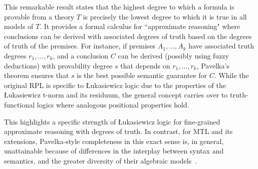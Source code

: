 This remarkable result states that the highest degree to which a formula is provable from a theory $T$ is precisely the lowest degree to which it is true in all models of $T$. It provides a formal calculus for ``approximate reasoning" where conclusions can be derived with associated degrees of truth based on the degrees of truth of the premises. For instance, if premises $A_1, \ldots, A_k$ have associated truth degrees $r_1, \ldots, r_k$, and a conclusion $C$ can be derived (possibly using fuzzy deductions) with provability degree $s$ that depends on $r_1, \ldots, r_k$, Pavelka's theorem ensures that $s$ is the best possible semantic guarantee for $C$. While the original RPL is specific to Łukasiewicz logic due to the properties of the Łukasiewicz t-norm and its residuum, the general concept carries over to truth-functional logics where analogous positional properties hold.

This highlights a specific strength of Łukasiewicz logic for fine-grained approximate reasoning with degrees of truth. In contrast, for MTL and its extensions, Pavelka-style completeness in this exact sense is, in general, unattainable because of differences in the interplay between syntax and semantics, and the greater diversity of their algebraic models~\cite[Rem. 4.1.22, Rem. 4.2.22]{Hajek1998}.
